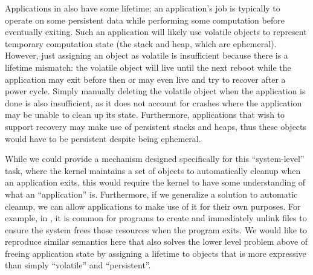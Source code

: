 Applications in \Twizzler also have some lifetime; an application's job is typically to operate on
some persistent data while performing some computation before eventually exiting. Such an
application will likely use volatile objects to represent temporary computation state (\eg the
stack and heap, which are ephemeral). However, just assigning an object as volatile is insufficient
because there is a lifetime mismatch: the volatile object will live until the next reboot while the
application may exit before then or may even live and try to recover after a power cycle. Simply
manually deleting the volatile object when the application is done is also insufficient, as it does
not account for crashes where the application may be unable to clean up its state. Furthermore,
applications that wish to support recovery may make use of persistent stacks and heaps, thus these
objects would have to be persistent despite being ephemeral.

While we could provide a mechanism designed specifically for this ``system-level'' task,
where the kernel maintains a set of objects to automatically cleanup when an application exits, this
would require the kernel to have some understanding of what an ``application'' is. Furthermore, if
we generalize a solution to automatic cleanup, we can allow applications to make use of it for their
own purposes. For example, in \unix, it is common for programs to create and immediately unlink
files to ensure the system frees those resources when the program exits. We would like to reproduce
similar semantics here that also solves the lower level problem above of freeing application state
by assigning a lifetime to objects that is more expressive than simply ``volatile'' and
``persistent''.

